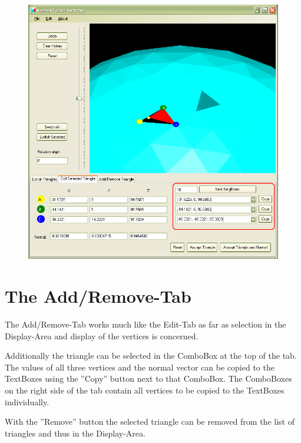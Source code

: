 \begin{figure}[htb]
	\centering
	\includegraphics[width=0.8\linewidth]{window7}
\end{figure}

\newpage
\section{The Add/Remove-Tab}

The Add/Remove-Tab works much like the Edit-Tab as far as selection in the Display-Area and display of the vertices is concerned.

Additionally the triangle can be selected in the ComboBox at the top of the tab. The values of all three vertices and the normal vector can be copied to the TextBoxes using the ''Copy'' button next to that ComboBox. The ComboBoxes on the right side of the tab contain all vertices to be copied to the TextBoxes individually.

With the ''Remove'' button the selected triangle can be removed from the list of triangles and thus in the Display-Area.

